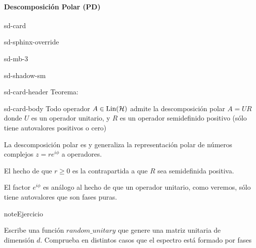 \documentclass[letterpaper,10pt,english]{jupyterBook}
\newcommand{\Hil}{{\cal H}}
\newcommand{\Lin}{\hbox{Lin}}
\begin{document}
\paragraph{Descomposición Polar (PD)}
\label{\detokenize{docs/Part_01_Formalismo/Chapter_01_02_Formalismo_matem_xe1tico/01_03_Operadores_myst:descomposicion-polar-pd}}
\begin{sphinxuseclass}{sd-card}
\begin{sphinxuseclass}{sd-sphinx-override}
\begin{sphinxuseclass}{sd-mb-3}
\begin{sphinxuseclass}{sd-shadow-sm}
\begin{sphinxuseclass}{sd-card-header}
\sphinxAtStartPar
Teorema:

\end{sphinxuseclass}
\begin{sphinxuseclass}{sd-card-body}
\sphinxAtStartPar
Todo operador \(A\in \Lin(\Hil)\) admite la descomposición polar \(A = UR\) donde \(U\) es un operador unitario, y \(R\) es un operador semi\sphinxhyphen{}definido positivo (sólo tiene autovalores positivos o cero)

\end{sphinxuseclass}
\end{sphinxuseclass}
\end{sphinxuseclass}
\end{sphinxuseclass}
\end{sphinxuseclass}
\sphinxAtStartPar
La descomposición polar es  y generaliza la representación polar de números complejos \(z = r e^{i\phi}\) a operadores.

\sphinxAtStartPar
El hecho de que \(r\geq 0\) es la contrapartida a que \(R\) sea semi\sphinxhyphen{}definida positiva.

\sphinxAtStartPar
El factor \(e^{i\phi}\) es análogo al hecho de que un operador unitario, como veremos, sólo tiene autovalores que son fases puras.

\begin{sphinxadmonition}{note}{Ejercicio}

\sphinxAtStartPar
Escribe una función \(random\_unitary\) que genere una matriz unitaria de dimensión \(d\).
Comprueba en distintos casos que el espectro está formado por fases
\end{sphinxadmonition}
\end{document}
